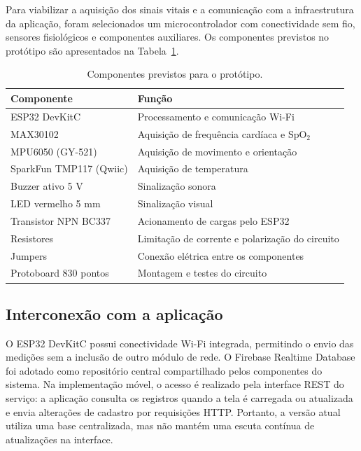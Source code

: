 \documentclass[12pt]{article}
\begin{document}
Para viabilizar a aquisição dos sinais vitais e a comunicação com a infraestrutura da aplicação, foram selecionados um microcontrolador com conectividade sem fio, sensores fisiológicos e componentes auxiliares. Os componentes previstos no protótipo são apresentados na Tabela~\ref{tab:componentes-hardware}.

\begin{table}[H]
\centering
\caption{Componentes previstos para o protótipo.}
\label{tab:componentes-hardware}
\begin{tabular}{|l|l|}
\hline
\textbf{Componente} & \textbf{Função} \\ \hline

ESP32 DevKitC & Processamento e comunicação Wi-Fi \\ \hline

MAX30102 & Aquisição de frequência cardíaca e SpO$_2$ \\ \hline

MPU6050 (GY-521) & Aquisição de movimento e orientação \\ \hline

SparkFun TMP117 (Qwiic) & Aquisição de temperatura \\ \hline

Buzzer ativo 5 V & Sinalização sonora \\ \hline

LED vermelho 5 mm & Sinalização visual \\ \hline

Transistor NPN BC337 & Acionamento de cargas pelo ESP32 \\ \hline

Resistores & Limitação de corrente e polarização do circuito \\ \hline

Jumpers & Conexão elétrica entre os componentes \\ \hline

Protoboard 830 pontos & Montagem e testes do circuito \\ \hline

\end{tabular}
\end{table}

\subsection{Interconexão com a aplicação}

O ESP32 DevKitC possui conectividade Wi-Fi integrada, permitindo o envio das medições sem a inclusão de outro módulo de rede. O Firebase Realtime Database foi adotado como repositório central compartilhado pelos componentes do sistema. Na implementação móvel, o acesso é realizado pela interface REST do serviço: a aplicação consulta os registros quando a tela é carregada ou atualizada e envia alterações de cadastro por requisições HTTP. Portanto, a versão atual utiliza uma base centralizada, mas não mantém uma escuta contínua de atualizações na interface.
\end{document}
